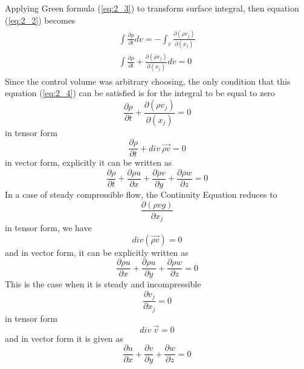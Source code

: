 \documentclass[11pt]{report}
\newcommand{\sps}{\\[0.2cm]}
\newcommand{\refn}[1]{(\ref{#1})}
\newcommand{\refx}[1]{\refn{eq:#1}}
\newcommand{\NI}{\noindent}
\begin{document}
	\NI Applying Green formula \refx{2_3} to transform surface integral, then equation \refx{2_2} becomes
	\begin{eqnarray}
		\begin{split}
			\int \frac{\partial \rho}{\partial t}dv = - \int_v \frac{\partial(\rho v_j)}{\partial(x_j)}\sps
			\int \frac{\partial\rho}{\partial t} + \frac{\partial(\rho v_j)}{\partial(x_j)}dv = 0
		\end{split} \label{eq:2_4}
	\end{eqnarray} 
	Since the control volume was arbitrary choosing, the only condition that this equation \refx{2_4} can be satisfied is for the integral to be equal to zero
	\begin{equation}
		\frac{\partial \rho}{\partial t} + \frac{\partial(\rho v_j)}{\partial(x_j)} = 0\label{eq:2_5}
	\end{equation}
	in tensor form
	\begin{equation}
		\frac{\partial\rho}{\partial t} + div~ \vec{\rho v} = 0\label{eq:2_6}
	\end{equation}
	in vector form, explicitly it can be written as
	\begin{equation}
		\frac{\partial \rho}{\partial t} + \frac{\partial \rho u}{\partial x} + \frac{\partial \rho v}{\partial y} + \frac{\partial\rho w}{\partial z} = 0\label{eq:2_7}
	\end{equation}
	In a case of steady compressible flow, the Continuity Equation reduces to
	\begin{equation}
		\frac{\partial(\rho vg)}{\partial x_j}
	\end{equation}
	in tensor form, we have
	\begin{equation}
		div(\vec{\rho v}) = 0
	\end{equation}
	and in vector form, it can be explicitly written as
	\begin{equation}
		\frac{\partial\rho u}{\partial x} + \frac{\partial\rho u}{\partial y} + \frac{\partial \rho w}{\partial z} = 0
	\end{equation}
	This is the case when it is steady and incompressible
	\begin{equation}
		\frac{\partial v_j}{\partial x_j}  = 0
	\end{equation}
	in tensor form
	\begin{equation}
		div~\vec{v} = 0
	\end{equation}
	and in vector form it is given as
	\begin{equation}
		\frac{\partial u}{\partial x} + \frac{\partial v}{\partial y} + \frac{\partial w}{\partial z} = 0
	\end{equation}
	
\end{document}
